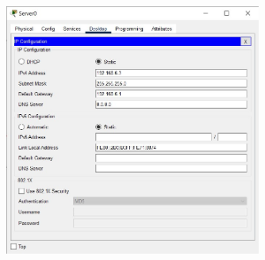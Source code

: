 \documentclass{article}
\begin{document}
\begin{figure}[H]
    \centering
    \includegraphics[width=0.75\textwidth]{figures/19.jpg}
    \caption{}
    \label{fig:fig1}
\end{figure}
\end{document}
